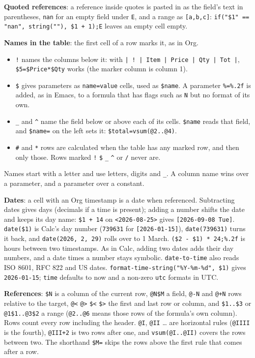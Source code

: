\documentclass[11pt]{article}
\begin{document}
\textbf{Quoted references}: a reference inside quotes is pasted in as the field's text in parentheses, \texttt{nan} for an empty field under \texttt{E}, and a range as \texttt{[a,b,c]}: \texttt{if("\$1" == "nan", string(""), \$1 + 1);E} leaves an empty cell empty.

\textbf{Names in the table}: the first cell of a row marks it, as in Org.
\begin{itemize}
\item \texttt{!} names the columns below it: with \texttt{| ! | Item | Price | Qty | Tot |}, \texttt{\$5=\$Price*\$Qty} works (the marker column is column 1).
\item \texttt{\$} gives parameters as \texttt{name=value} cells, used as \texttt{\$name}. A parameter \texttt{\%=\%.2f} is added, as in Emacs, to a formula that has flags such as \texttt{N} but no format of its own.
\item \texttt{\_} and \texttt{\textasciicircum{}} name the field below or above each of its cells. \texttt{\$name} reads that field, and \texttt{\$name=} on the left sets it: \texttt{\$total=vsum(@2..@4)}.
\item \texttt{\#} and \texttt{*} rows are calculated when the table has any marked row, and then only those. Rows marked \texttt{!} \texttt{\$} \texttt{\_} \texttt{\textasciicircum{}} or \texttt{/} never are.
\end{itemize}

Names start with a letter and use letters, digits and \texttt{\_}. A column name wins over a parameter, and a parameter over a constant.

\textbf{Dates}: a cell with an Org timestamp is a date when referenced. Subtracting dates gives days (decimals if a time is present); adding a number shifts the date and keeps its day name: \texttt{\$1 + 14} on \texttt{<2026-08-25>} gives \texttt{[2026-09-08 Tue]}. \texttt{date(\$1)} is Calc's day number (\texttt{739631} for \texttt{[2026-01-15]}), \texttt{date(739631)} turns it back, and \texttt{date(2026, 2, 29)} rolls over to 1 March. \texttt{(\$2 - \$1) * 24;\%.2f} is hours between two timestamps. As in Calc, adding two dates adds their day numbers, and a date times a number stays symbolic. \texttt{date-to-time} also reads ISO 8601, RFC 822 and US dates. \texttt{format-time-string("\%Y-\%m-\%d", \$1)} gives \texttt{2026-01-15}; \texttt{time} defaults to now and a non-zero \texttt{utc} formats in UTC.

\textbf{References}: \texttt{\$N} is a column of the current row, \texttt{@N\$M} a field, \texttt{@-N} and \texttt{@+N} rows relative to the target, \texttt{@<} \texttt{@>} \texttt{\$<} \texttt{\$>} the first and last row or column, and \texttt{\$1..\$3} or \texttt{@1\$1..@3\$2} a range (\texttt{@2..@6} means those rows of the formula's own column). Rows count every row including the header. \texttt{@I}, \texttt{@II} \ldots{} are horizontal rules (\texttt{@IIII} is the fourth), \texttt{@III+2} is two rows after one, and \texttt{vsum(@I..@II)} covers the rows between two. The shorthand \texttt{\$M=} skips the rows above the first rule that comes after a row.
\end{document}
